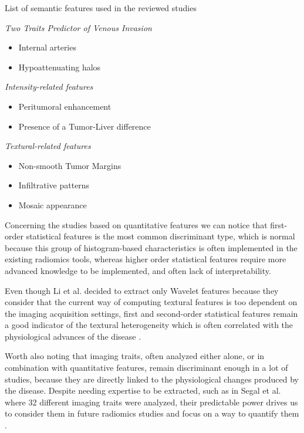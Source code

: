 \documentclass[]{article}
\begin{document}
\begin{table}{}
\caption{List of semantic features used in the reviewed studies}
\label{tab:SemanticFeatures}
\emph{Two Traits Predictor of Venous Invasion}
\begin{itemize}
\item Internal arteries \cite{Renzulli2016,Kuo2007,Peng2018,Segal2007,Banerjee2015,Taouli2017}
\item Hypoattenuating halos \cite{Renzulli2016,Peng2018,Segal2007,Banerjee2015}
\end{itemize}
\emph{Intensity-related features}
\begin{itemize}
\item Peritumoral enhancement \cite{Renzulli2016}
\item Presence of a Tumor-Liver difference \cite{Banerjee2015}
\end{itemize}
\emph{Textural-related features}
\begin{itemize}
\item Non-smooth Tumor Margins \cite{Renzulli2016,Kuo2007,Peng2018}
\item Infiltrative patterns \cite{Taouli2017}
\item Mosaic appearance \cite{Taouli2017}
\end{itemize}
\end{table}

Concerning the studies based on quantitative features we can notice that
first-order statistical features is the most common discriminant type,
which is normal because this group of histogram-based characteristics is
often implemented in the existing radiomics tools, whereas higher order
statistical features require more advanced knowledge to be implemented,
and often lack of interpretability.

Even though Li et al. decided to extract only Wavelet features
because they consider that the current way of computing textural
features is too dependent on the imaging acquisition settings, first and
second-order statistical features remain a good indicator of the
textural heterogeneity which is often correlated with the physiological
advances of the disease \cite{Li2016}.

Worth also noting that imaging traits, often analyzed either alone, or
in combination with quantitative features, remain discriminant enough in
a lot of studies, because they are directly linked to the physiological
changes produced by the disease. Despite needing expertise to be
extracted, such as in Segal et al. where 32 different imaging
traits were analyzed, their predictable power drives us to consider them
in future radiomics studies and focus on a way to quantify them \cite{Segal2007}.
\end{document}
